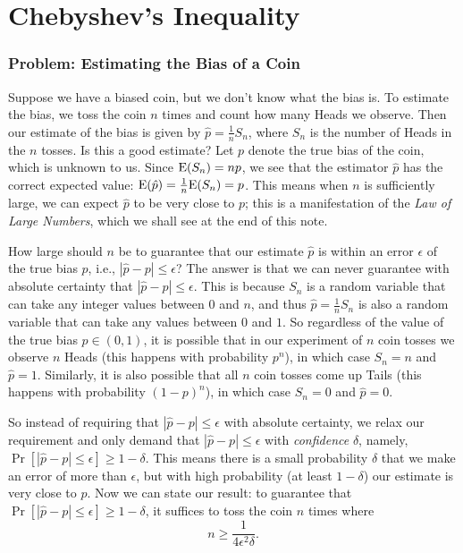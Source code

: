 \documentclass[11pt]{article}
\def\Ex#1{{\rm E}(#1)}
\begin{document}
\maketitle

\section*{Chebyshev's Inequality}

\subsubsection*{Problem: Estimating the Bias of a Coin}

Suppose we have a biased coin, but we don't know what the bias is. To estimate the bias, we
toss the coin $n$ times and count how many Heads we observe. 
Then our estimate of the bias is given by $\hat p = \frac{1}{n} S_n$, where $S_n$
is the number of Heads in the $n$ tosses. Is this a good estimate? Let $p$ denote the
true bias of the coin, which is unknown to us. Since $\Ex{S_n} = np$, we see that
the estimator $\hat p$ has the correct expected value: $\Ex{\hat p} = \frac{1}{n} \Ex{S_n} = p$.
This means when $n$ is sufficiently large, we can expect $\hat p$ to be very close to
$p$; this is a manifestation of the {\em Law of Large Numbers}, which we shall see at the end
of this note.

How large should $n$ be to guarantee that our estimate $\hat p$ is within
an error $\epsilon$ of the true bias $p$, i.e., $|\hat p - p| \le \epsilon$? 
The answer is that we can never guarantee with absolute certainty that
$|\hat p - p| \le \epsilon$. This is because $S_n$ is a random variable that can
take any integer values between $0$ and $n$, and thus $\hat p = \frac{1}{n} S_n$ 
is also a random variable that can take any values between $0$ and $1$. So regardless of the value of
the true bias $p \in (0,1)$, it is possible that in our experiment of $n$ coin tosses
we observe $n$ Heads (this happens with probability $p^n$), in which case $S_n = n$ and $\hat p = 1$.
Similarly, it is also possible that all $n$ coin tosses come up Tails (this happens with probability $(1-p)^n$),
in which case $S_n = 0$ and $\hat p = 0$. 

So instead of requiring that $|\hat p - p| \le \epsilon$ with absolute certainty, we relax our requirement
and only demand that $|\hat p - p| \le \epsilon$ with {\em confidence} $\delta$, namely,
$\Pr[|\hat p - p| \le \epsilon] \ge 1-\delta$. This means there is a small probability $\delta$ that we make
an error of more than $\epsilon$,  but with high probability (at least $1-\delta$) our estimate is very close
to $p$. Now we can state our result: to guarantee that $\Pr[|\hat p - p| \le \epsilon] \ge 1-\delta$, it suffices
to toss the coin $n$ times where $$n \ge \frac{1}{4\epsilon^2 \delta}.$$
\end{document}
